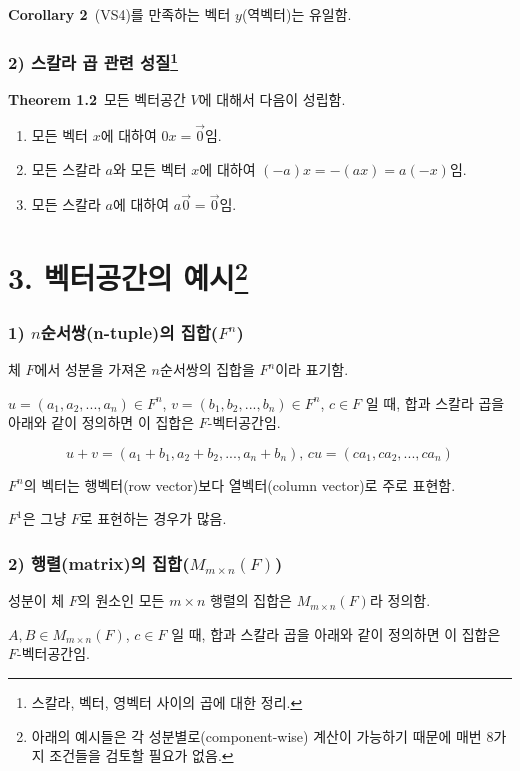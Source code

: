 \documentclass[10pt, a4paper]{article}
\begin{document}
\textbf{Corollary 2}\, (VS4)를 만족하는 벡터 $y$(역벡터)는 유일함.

\subsubsection*{2) 스칼라 곱 관련 성질\footnote{스칼라, 벡터, 영벡터 사이의 곱에 대한 정리.}}

\textbf{Theorem 1.2}\, 모든 벡터공간 $V$에 대해서 다음이 성립함.

\begin{enumerate}
    \item 모든 벡터 $x$에 대하여 $0x= \vec{0}$임.
    \item 모든 스칼라 $a$와 모든 벡터 $x$에 대하여 $(-a)x=-(ax)=a(-x)$임.
    \item 모든 스칼라 $a$에 대하여 $a \vec{0} = \vec{0}$임.\\
\end{enumerate}



\section*{3. 벡터공간의 예시\footnote{아래의 예시들은 각 성분별로(component-wise) 계산이 가능하기 때문에 매번 8가지 조건들을 검토할 필요가 없음.}}
\subsubsection*{1) $n$순서쌍(n-tuple)의 집합($F^n$)}
체 $F$에서 성분을 가져온 $n$순서쌍의 집합을 $F^n$이라 표기함.

$u=(a_1,a_2, ... ,a_n) \in F^n$, $v=(b_1,b_2, ... ,b_n) \in F^n$, $c \in F$ 일 때, 합과 스칼라 곱을 아래와 같이 정의하면 이 집합은 $F$-벡터공간임.

\[u+v=(a_1+b_1,a_2+b_2, ... ,a_n+b_n),\,cu=(ca_1,ca_2, ... ,ca_n)\]

$F^n$의 벡터는 행벡터(row vector)보다 열벡터(column vector)로 주로 표현함.

$F^1$은 그냥 $F$로 표현하는 경우가 많음.


\subsubsection*{2) 행렬(matrix)의 집합($M_{m \times n}(F)$)}
성분이 체 $F$의 원소인 모든 $m \times n$ 행렬의 집합은 $M_{m \times n}(F)$라 정의함.

$A,B \in M_{m \times n}(F)$, $c \in F$ 일 때, 합과 스칼라 곱을 아래와 같이 정의하면 이 집합은 $F$-벡터공간임.
\end{document}
